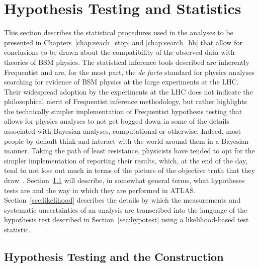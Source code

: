 \section{Hypothesis Testing and Statistics}
\label{sec:stat_hypo}

This section describes the statistical procedures used in the analyses to be
presented in Chapters~\ref{chap:seach_stop} and \ref{chap:search_hh} that allow
for conclusions to be drawn about the compatibility of the observed data with theories of
BSM physics.
The statistical inference tools described are inherently Frequentist and
are, for the most part, the \textit{de facto} standard for physics analyses searching for evidence of BSM physics
at the large experiments at the LHC.
Their widespread adoption by the experiments at the LHC does not indicate the
philosophical merit of Frequentist inference methodology, but rather highlights the technically simpler implementation
of Frequentist hypothesis testing that allows for physics analyses to not get
bogged down in some of the details associated with Bayesian analyses, computational
or otherwise.
Indeed, most people by default think and interact with the world around them
in a Bayesian manner.
Taking the path of least resistance, physicists have tended to opt for the simpler
implementation of reporting their results, which, at the end of the day,
tend to not lose out much in terms of the picture of the objective truth that they draw~\cite{CousinsBayes}.
Section~\ref{sec:hypo_test} will describe, in somewhat general terms, what
hypotheses tests are and the way in which they are performed in ATLAS.
Section~\ref{sec:likelihood} describes the details by which the measurements and systematic
uncertainties of
an analysis are transcribed into the language of the hypothesis test described
in Section~\ref{sec:hypotest} using a likelihood-based test statistic.


%
%

\subsection{Hypothesis Testing and the \cls Construction}
\label{sec:hypo_test}

